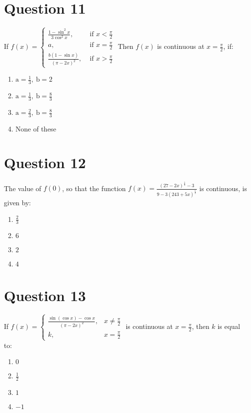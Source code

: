 \documentclass{article}
\begin{document}
\section*{Question 11}
If \(f(x)=\left\{\begin{array}{ll}\frac{1-\sin ^{2} x}{3 \cos ^{2} x}, & \text { if } x<\frac{\pi}{2} \\ a, & \text { if } x=\frac{\pi}{2} \\ \frac{b(1-\sin x)}{(\pi-2 x)^{2}}, & \text { if } x>\frac{\pi}{2}\end{array}\right.\) Then \(f(x)\) is continuous at \(x=\frac{\pi}{2}\), if:
\begin{enumerate}[label=(\alph*)]
\item \(\mathrm{a}=\frac{1}{3}, \mathrm{~b}=2\)
\item \(\mathrm{a}=\frac{1}{3}, \mathrm{~b}=\frac{8}{3}\)
\item \(\mathrm{a}=\frac{2}{3}, \mathrm{~b}=\frac{8}{3}\)
\item None of these
\end{enumerate}
\newpage
\section*{Question 12}
The value of \(f(0)\), so that the function \(f(x)=\frac{(27-2 x)^{\frac{1}{3}}-3}{9-3(243+5 x)^{\frac{1}{5}}}\) is continuous, is given by:
\begin{enumerate}[label=(\alph*)]
\item \(\frac{2}{3}\)
\item \(6\)
\item \(2\)
\item \(4\)
\end{enumerate}
\newpage
\section*{Question 13}
If \({f}({x})=\left\{\begin{array}{ll}\frac{\sin (\cos {x})-\cos {x}}{(\pi-2 {x})^{2}}, & {x} \neq \frac{\pi}{2} \\ {k}, & {x}=\frac{\pi}{2}\end{array}\right.\) is continuous at \({x}=\frac{\pi}{2}\), then \({k}\) is equal to:
\begin{enumerate}[label=(\alph*)]
\item \(0\)
\item \(\frac{1}{2}\)
\item \(1\)
\item \(-1\)
\end{enumerate}
\newpage
\end{document}
